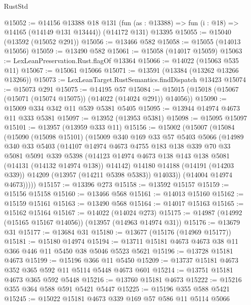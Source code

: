 \begin{lexlean}{RustStd}
\begin{coremodule}
@15052 := @14156
    @13388
    @18
    @131
    (fun (as : @13388) => fun (i : @18) => @14165 (@14149 @131 @13444))
    (@14172 @131)
    @13395
@15055 := @15040 (@13592 (@15052 @291))
@15056 := @13466 @582
@15058 := @15055 (@14013 @15056)
@15059 := @13490 @582
@15061 := @15058 (@14017 @15059)
@15063 := LexLeanPreservation.Rust.flagOf @13364
@15066 := @14022 (@15063 @535 @11)
@15067 := @15061 @15066
@15071 := @13591 (@13384 (@13262 @13266 @13266))
@15073 := LexLeanTarget.RustSemantics.findDispatch @13423
@15074 := @15073 @291
@15075 := @14195 @57
@15084 := @15015 (@15018 (@15067 (@15071 (@15074 @15075)) (@14022 (@14024 @291)) @14056))
@15090 := @15009 @334 @342 @11 @539 @5381 @5405
@15095 := @13944 @14974 @4673 @11 @333 @5381
@15097 := @13952 (@13953 @5381)
@15098 := @15095 @15097
@15101 := @13957 (@13959 @333 @11)
@15156 := @15002
    (@15007
      (@15084
        (@15090
          (@15098 @15101)
          (@15009
            @340
            @169
            @33
            @57
            @5403
            @5066
            (@14989
              @340
              @33
              @5403
              (@14107
                @14974
                @4673
                @4755
                @183
                @138
                @339
                @70
                @33
                @5081
                @5091
                @339
                @5398
                (@14123 @14974 @4673 @138 @143 @138 @5081 (@14131 (@14132 @14974 @138)) @14142)
                @14180
                @14188
                (@14191 (@14203 @339))
                @14209
                (@13957 (@14211 @5398 @5383))
                @14033))
            (@14004 @14974 @4673)))))
@15157 := @13396 @273
@15158 := @13592 @15157
@15159 := @15156 @15158
@15160 := @13466 @568
@15161 := @14013 @15160
@15162 := @15159 @15161
@15163 := @13490 @568
@15164 := @14017 @15163
@15165 := @15162 @15164
@15167 := @14022 (@14024 @273)
@15175 := @14987 (@14992 (@15165 @15167 @14056)) (@13957 (@14963 @14974 @31))
@15176 := @13679 @31
@15177 := @13684 @31
@15180 := @13677 (@15176 (@14969 @15177))
@15181 := @15180 @14974
@15194 := @13711 @15181 @4673 @4673 @38 @11 @366 @446 @11 @5450 @38 @5046 @5523 @5621
@15196 := @13728 @15181 @4673
@15199 := @15196 @366 @11 @5450
@15209 := @13737 @15181 @4673 @352 @365 @592 @11 @5114 @5448 @4673 @601
@15214 := @13751 @15181 @4673 @365 @592 @5448
@15216 := @13760 @15181 @4673
@15222 := @15216 @355 @364 @588 @591 @5421 @5447
@15225 := @15196 @355 @588 @5421
@15245 := @15022
    @15181
    @4673
    @339
    @169
    @57
    @586
    @11
    @5114
    @5066

\end{coremodule}
\end{lexlean}
